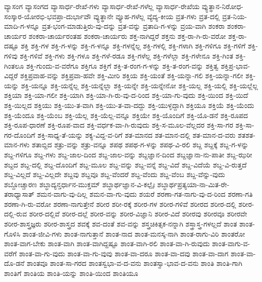 {ವ್ಯಾಸಂಗ
ವ್ಯಾಸಂಗದ
ವ್ಯಾಸಾರ್ಧ-ರೇಖೆ-ಗಳು
ವ್ಯಾಸಾರ್ಧ-ರೇಖೆ-ಗಳೆಲ್ಲ
ವ್ಯಾಸಾರ್ಧ-ರೇಖೆಯ
ವ್ಯುತ್ಥಾನ-ನಿರೋಧ-ಸಂಸ್ಕಾರ-ಯೋರಭಿ-ಭವಪ್ರಾ-ದುರ್ಭಾವೌ
ವ್ಯುತ್ಥಾನೇ
ವ್ಯೂಹ-ಗಳೆಲ್ಲ
ವ್ಯೆದ್ಯ-ಕೀಯ
ವ್ರತ-ಗಳು
ವ್ರತ-ದಲ್ಲಿ
ವ್ರತ-ನಿಯ-ಮಾದಿ-ಗ-ಳನ್ನೂ
ವ್ರತ-ಭಂಗ-ಮಾಡುತ್ತಿರು-ವು-ದನ್ನು
ವ್ರತ-ವನ್ನು
ವ್ರತಾದಿ-ಗ-ಳನ್ನು
ವ್ರಯ-ವಾಗಿ
ಶಂಕರಾ
ಶಂಕರಾ-ಚಾರ್ಯರ
ಶಂಕರಾ-ಚಾರ್ಯರಂತಹ
ಶಂಕರಾ-ಚಾರ್ಯರು
ಶಕ್ತ-ನಾಗಿದ್ದರೆ
ಶಕ್ತನು
ಶಕ್ತ-ರಾ-ಗಿ-ರು-ವರೋ
ಶಕ್ತ-ರಾ-ದಷ್ಟೂ
ಶಕ್ತಿ
ಶಕ್ತಿ-ಗಳ
ಶಕ್ತಿ-ಗ-ಳನ್ನು
ಶಕ್ತಿ-ಗ-ಳನ್ನೂ
ಶಕ್ತಿ-ಗಳನ್ನೆಲ್ಲ
ಶಕ್ತಿ-ಗಳಲ್ಲಿ
ಶಕ್ತಿ-ಗಳಾಗಿ
ಶಕ್ತಿ-ಗಳಿಗೂ
ಶಕ್ತಿ-ಗಳಿಗೆ
ಶಕ್ತಿ-ಗಳಿವು
ಶಕ್ತಿ-ಗಳಿವೆ
ಶಕ್ತಿ-ಗಳು
ಶಕ್ತಿ-ಗಳೂ
ಶಕ್ತಿ-ಗಳೆ-ರಡೂ
ಶಕ್ತಿ-ಗಳೆಲ್ಲ
ಶಕ್ತಿ-ಗಳೆಲ್ಲಾ
ಶಕ್ತಿ-ಗಳೇನೂ
ಶಕ್ತಿ-ಗಿಂತ
ಶಕ್ತಿ-ಗಿಂತಲೂ
ಶಕ್ತಿ-ಗುಂದು-ವ-ವರೆಗೂ
ಶಕ್ತಿಗೂ
ಶಕ್ತಿಗೆ
ಶಕ್ತಿ-ತ-ರಂಗ-ಗ-ಳನ್ನು
ಶಕ್ತಿ-ತ-ರಂಗ-ವನ್ನು
ಶಕ್ತಿತ್ವ
ಶಕ್ತಿಪ್ರ-ಭಾವ-ವಿದ್ದರೆ
ಶಕ್ತಿಪ್ರವಾಹ-ವನ್ನು
ಶಕ್ತಿಪ್ರವಾ-ಹವೇ
ಶಕ್ತಿ-ಮೀರಿ
ಶಕ್ತಿಯ
ಶಕ್ತಿ-ಯಂತೆ
ಶಕ್ತಿ-ಯನ್ನಾ-ಗಲಿ
ಶಕ್ತಿ-ಯನ್ನಾ-ಗಲೀ
ಶಕ್ತಿ-ಯನ್ನು
ಶಕ್ತಿ-ಯನ್ನೂ
ಶಕ್ತಿ-ಯನ್ನೆಲ್ಲ
ಶಕ್ತಿ-ಯನ್ನೆಲ್ಲಾ
ಶಕ್ತಿ-ಯನ್ನೇ
ಶಕ್ತಿ-ಯನ್ನೇನೋ
ಶಕ್ತಿ-ಯಲ್ಲ
ಶಕ್ತಿ-ಯಲ್ಲಿ
ಶಕ್ತಿ-ಯಲ್ಲೆಲ್ಲ
ಶಕ್ತಿಯಾ
ಶಕ್ತಿ-ಯಾ-ಗಲೀ
ಶಕ್ತಿ-ಯಾಗಿ
ಶಕ್ತಿ-ಯಾ-ಗಿ-ರು-ವು-ದ-ರಿಂದ
ಶಕ್ತಿ-ಯಾ-ಗು-ವುದು
ಶಕ್ತಿ-ಯಿಂದ
ಶಕ್ತಿ-ಯಿದೆ
ಶಕ್ತಿ-ಯಿಲ್ಲದ
ಶಕ್ತಿಯು
ಶಕ್ತಿ-ಯು-ತ-ವಾಗಿ
ಶಕ್ತಿ-ಯು-ತ-ವಾ-ದದ್ದು
ಶಕ್ತಿ-ಯುಳ್ಳದ್ದಾಗಿ
ಶಕ್ತಿಯೂ
ಶಕ್ತಿಯೆ
ಶಕ್ತಿ-ಯೆಂದು
ಶಕ್ತಿ-ಯೆಂದೂ
ಶಕ್ತಿ-ಯೆಂಬ
ಶಕ್ತಿ-ಯೆಲ್ಲ
ಶಕ್ತಿ-ಯೆಲ್ಲ-ವನ್ನೂ
ಶಕ್ತಿಯೇ
ಶಕ್ತಿ-ಯೊಂದಿಗೆ
ಶಕ್ತಿ-ಯೊ-ಡನೆ
ಶಕ್ತಿ-ರೂಪದ
ಶಕ್ತಿ-ರೂಪ-ಧಾರಣೆ
ಶಕ್ತಿ-ರೂಪ-ವಾದ
ಶಕ್ತಿ-ವರ್ಧಕ-ವಾ-ಗಿ-ರುವುದು
ಶಕ್ತಿ-ಸ-ಮೂಲ-ವೆಲ್ಲದರ
ಶಕ್ತಿ-ಸಾ-ಗರ
ಶಕ್ತಿ-ಸಾ-ಗರ-ದೊಂದಿಗೆ
ಶಕ್ತಿ-ಸಾಧ್ಯ-ತೆ-ಯನ್ನು
ಶಕ್ಯ-ವಿದ್ದ-ವ-ರಿಗೆ
ಶತ-ಮಾನದ
ಶತ-ಮಾನ-ದಲ್ಲಿ
ಶತ-ಮಾನ-ದ-ವರು
ಶತಶತ-ಮಾನ-ಗಳು
ಶತಾಬ್ದಿದ
ಶತ್ರು-ವನ್ನು
ಶತ್ರು-ವನ್ನೂ
ಶಪಥ
ಶಪಥ-ಗ-ಳನ್ನು
ಶಪಥ-ವಿ-ರಲಿ
ಶಬ್ದ
ಶಬ್ದಕ್ಕೆ
ಶಬ್ದ-ಗ-ಳನ್ನು
ಶಬ್ದ-ಗಳಿಗೂ
ಶಬ್ದ-ಗಳು
ಶಬ್ದ-ಜಾಲ-ದಿಂದ
ಶಬ್ದ-ಜಾಲ-ವನ್ನು
ಶಬ್ದಜ್ಞಾನ-ದಿಂದ
ಶಬ್ದಜ್ಞಾನಾ-ನು-ಪಾತೀ
ಶಬ್ದ-ಝರೀ
ಶಬ್ದದ
ಶಬ್ದ-ದಲ್ಲಿ
ಶಬ್ದ-ದೊಂದಿಗೆ
ಶಬ್ದ-ಮೂಲ
ಶಬ್ದ-ವನ್ನು
ಶಬ್ದ-ವನ್ನೆ
ಶಬ್ದ-ವಿದೆ
ಶಬ್ದ-ವಿದೆಯೆ
ಶಬ್ದ-ವಿ-ರುತ್ತದೆ
ಶಬ್ದ-ವಿಲ್ಲದೆ
ಶಬ್ದ-ವಿಲ್ಲದೇ
ಶಬ್ದವು
ಶಬ್ದವೂ
ಶಬ್ದ-ವೆಂದರೆ
ಶಬ್ದ-ವೆಂದು
ಶಬ್ದ-ವೆಂಬ
ಶಬ್ದ-ವೆನ್ನು-ವುದು
ಶಬ್ದೋಚ್ಚಾರಣ
ಶಬ್ಧಾದ್ಯನ್ತರ್ಧಾನ-ಮುಕ್ತಮ್
ಶಬ್ಧಾರ್ಥಜ್ಞಾನ-ವಿ-ಕಲ್ಪೈಃ
ಶಬ್ಧಾರ್ಥಪ್ರತ್ಯಯಾ-ನಾ-ಮಿತ-ರೇ-ತರಾಧ್ಯಾಸಾತ್
ಶಮನ-ವಾಗು-ವು-ದಿಲ್ಲ
ಶಮನ-ವಾ-ಗು-ವುದು
ಶಯರೆ
ಶರಣಾ-ಗತ-ನಾಗು-ವು-ದ-ರಿಂದ
ಶರಣಾ-ಗತಿ
ಶರಣಾ-ಗಿ-ರು-ವರೋ
ಶರಣಾ-ನಾಗುತ್ತೇನೆ
ಶರೀರ
ಶರೀ-ರಕ್ಕೆ
ಶರೀರ-ಗಳ
ಶರೀರ-ಗಳಿವೆ
ಶರೀರದ
ಶರೀರ-ದಲ್ಲಿ
ಶರೀರ-ದಲ್ಲಿ-ರುವ
ಶರೀರ-ದಲ್ಲಿವೆ
ಶರೀರ-ದಲ್ಲೆ
ಶರೀರ-ವನ್ನು
ಶರೀರ-ವಿಜ್ಞಾನಿ
ಶರೀರ-ವಿದೆ
ಶರೀರವು
ಶರೀರವೂ
ಶರೀರವೇ
ಶರೀರ-ಶಾಸ್ತ್ರಜ್ಞರು
ಶರೀರ-ಶಾಸ್ತ್ರದ
ಶವಕ್ಕೆ
ಶವ-ದಂತೆ
ಶವ-ವನ್ನು
ಶಸ್ತ್ರಚಿಕಿತ್ಸಕ-ನನ್ನಾಗಿ
ಶಸ್ತ್ರಾಸ್ತ್ರ-ಗಳಲ್ಲದೆ
ಶಾಂತ
ಶಾಂತ-ಗೊಳಿಸಿ
ಶಾಂತ-ಜೀವಿ-ಗಳು
ಶಾಂತ-ನಾಗುತ್ತಾನೆ
ಶಾಂತ-ನಾದ
ಶಾಂತ-ಮನಸ್ಕ-ನಾಗಿ
ಶಾಂತ-ರಾಗು-ವಿರಿ
ಶಾಂತರೋ
ಶಾಂತ-ವಾಗ-ಬೇಕು
ಶಾಂತ-ವಾಗಿ
ಶಾಂತ-ವಾಗಿದ್ದಷ್ಟೂ
ಶಾಂತ-ವಾಗಿ-ರಲಿ
ಶಾಂತ-ವಾ-ಗಿ-ರುವುದು
ಶಾಂತ-ವಾಗು-ವ-ವರೆಗೆ
ಶಾಂತ-ವಾ-ಗು-ವುದು
ಶಾಂತ-ವಾ-ಗು-ವುವು
ಶಾಂತ-ವಾ-ದರೂ
ಶಾಂತ-ವಾ-ದವು
ಶಾಂತ-ವಾ-ದಾಗ
ಶಾಂತ-ವಾ-ದೊ-ಡನೆ
ಶಾಂತವೂ
ಶಾಂತ-ಸಾ-ಗರದ
ಶಾಂತಸ್ವಭಾ-ವ-ದ-ವನು
ಶಾಂತಸ್ವಾ-ಭಾವ-ದ-ವನು
ಶಾಂತಿ
ಶಾಂತಿ-ಗಾಗಿ
ಶಾಂತಿಗೆ
ಶಾಂತಿಯ
ಶಾಂತಿ-ಯನ್ನು
ಶಾಂತಿ-ಯಿಂದ
ಶಾಂತಿಯೂ
}
